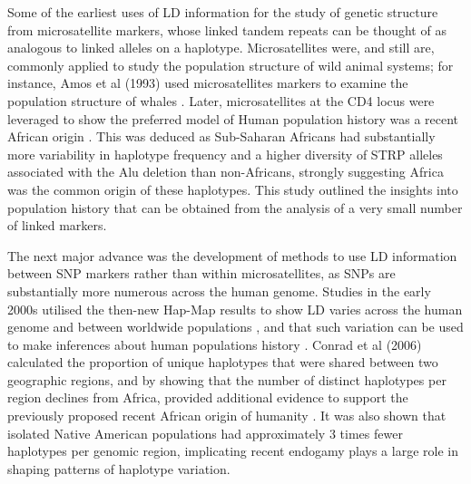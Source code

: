 Some of the earliest uses of LD information for the study of genetic structure from microsatellite markers, whose linked tandem repeats can be thought of as analogous to linked alleles on a haplotype. Microsatellites were, and still are, commonly applied to study the population structure of wild animal systems; for instance, Amos et al (1993) used microsatellites markers to examine the population structure of whales \cite{amos1993social}. Later, microsatellites at the CD4 locus were leveraged to show the preferred model of Human population history was a recent African origin \cite{tishkoff1996global}. This was deduced as Sub-Saharan Africans had substantially more variability in haplotype frequency and a higher diversity of STRP alleles associated with the Alu deletion than non-Africans, strongly suggesting Africa was the common origin of these haplotypes. This study outlined the insights into population history that can be obtained from the analysis of a very small number of linked markers.  

The next major advance was the development of methods to use LD information between SNP markers rather than within microsatellites, as SNPs are substantially more numerous across the human genome. Studies in the early 2000s utilised the then-new Hap-Map results \cite{gibbs2003international} to show LD varies across the human genome \cite{crawford2004evidence} and between worldwide populations \cite{evans2005comparison, reich2001linkage}, and that such variation can be used to make inferences about human populations history \cite{conrad2006worldwide}. Conrad et al (2006) calculated the proportion of unique haplotypes that were shared between two geographic regions, and by showing that the number of distinct haplotypes per region declines from Africa, provided additional evidence to support the previously proposed recent African origin of humanity \cite{cann1987mitochondrial}. It was also shown that isolated Native American populations had approximately 3 times fewer haplotypes per genomic region, implicating recent endogamy plays a large role in shaping patterns of haplotype variation. 
 
